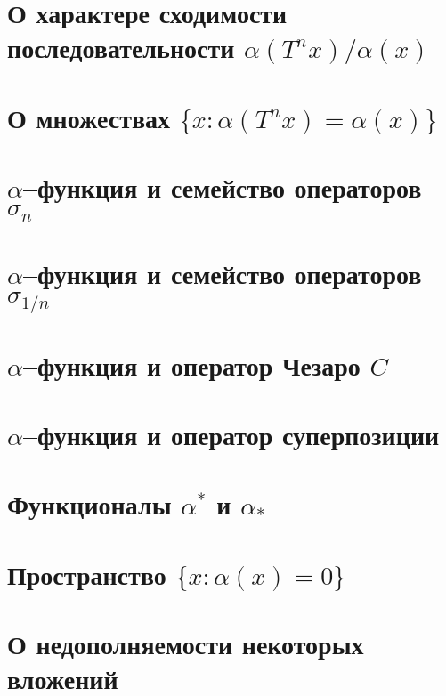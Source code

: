 \documentclass[12pt,a4paper,openbib]{report}
\theoremstyle{definition}
\begin{document}
	\section{О характере сходимости последовательности $\alpha(T^n x)/ \alpha(x)$}
	

	\section{О множествах $\{x: \alpha(T^n x) = \alpha(x)\}$}
	

	\section{$\alpha$--функция и семейство операторов $\sigma_n$}
	

	\section{$\alpha$--функция и семейство операторов $\sigma_{1/n}$}
	

	\section{$\alpha$--функция и оператор Чезаро $C$}
	

	\section{$\alpha$--функция и оператор суперпозиции}
	

	\section{Функционалы $\alpha^*$ и $\alpha_*$}
	

	\section{Пространство $\{x: \alpha(x) = 0\}$}
	

	\section{О недополняемости некоторых вложений}
	
\end{document}
